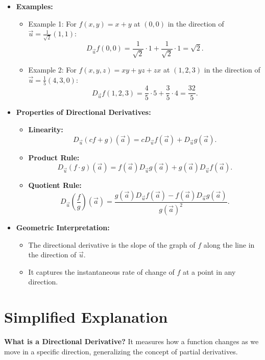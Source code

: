 \documentclass{article}
\begin{document}
\begin{itemize}
  \item \textbf{Examples:}
    \begin{itemize}
      \item Example 1: For $f(x, y) = x + y$ at $(0, 0)$ in the direction of $\vec{u} = \frac{1}{\sqrt{2}}(1, 1)$:
        \[
          D_{\vec{u}} f(0, 0) = \frac{1}{\sqrt{2}} \cdot 1 + \frac{1}{\sqrt{2}} \cdot 1 = \sqrt{2}.
        \]
      \item Example 2: For $f(x, y, z) = xy + yz + zx$ at $(1, 2, 3)$ in the direction of $\vec{u} = \frac{1}{5}(4, 3, 0)$:
        \[
          D_{\vec{u}} f(1, 2, 3) = \frac{4}{5} \cdot 5 + \frac{3}{5} \cdot 4 = \frac{32}{5}.
        \]
    \end{itemize}

  \item \textbf{Properties of Directional Derivatives:}
    \begin{itemize}
      \item \textbf{Linearity:}
        \[
          D_{\vec{u}} (c f + g)(\vec{a}) = c D_{\vec{u}} f(\vec{a}) + D_{\vec{u}} g(\vec{a}).
        \]
      \item \textbf{Product Rule:}
        \[
          D_{\vec{u}} (f \cdot g)(\vec{a}) = f(\vec{a}) D_{\vec{u}} g(\vec{a}) + g(\vec{a}) D_{\vec{u}} f(\vec{a}).
        \]
      \item \textbf{Quotient Rule:}
        \[
          D_{\vec{u}} \left(\frac{f}{g}\right)(\vec{a}) = \frac{g(\vec{a}) D_{\vec{u}} f(\vec{a}) - f(\vec{a}) D_{\vec{u}} g(\vec{a})}{g(\vec{a})^2}.
        \]
    \end{itemize}

  \item \textbf{Geometric Interpretation:}
    \begin{itemize}
      \item The directional derivative is the slope of the graph of $f$ along the line in the direction of $\vec{u}$.
      \item It captures the instantaneous rate of change of $f$ at a point in any direction.
    \end{itemize}
\end{itemize}

\section*{Simplified Explanation}

\textbf{What is a Directional Derivative?}
It measures how a function changes as we move in a specific direction, generalizing the concept of partial derivatives.
\end{document}

